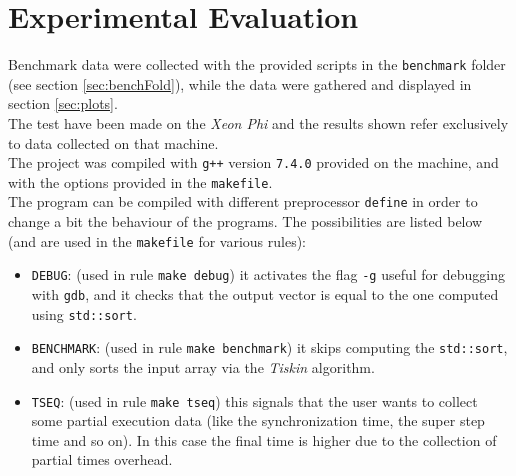 \documentclass[]{article}
\def\code#1{\texttt{#1}}
\begin{document}
\section{Experimental Evaluation}
\label{sec:eval}
Benchmark data were collected with the provided scripts in the \code{benchmark} folder (see section \ref{sec:benchFold}), while the data were gathered and displayed in section \ref{sec:plots}. \\
The test have been made on the \emph{Xeon Phi} and the results shown refer exclusively to data collected on that machine. \\
The project was compiled with \code{g++} version \code{7.4.0} provided on the machine, and with the options provided in the \code{makefile}. \\
The program can be compiled with different preprocessor \code{define} in order to change a bit the behaviour of the programs. The possibilities are listed below (and are used in the \code{makefile} for various rules):
\begin{itemize}
	\item \code{DEBUG}: (used in rule \code{make debug}) it activates the flag \code{-g} useful for debugging with \code{gdb}, and it checks that the output vector is equal to the one computed using \code{std::sort}.
	\item \code{BENCHMARK}: (used in rule \code{make benchmark}) it skips computing the \code{std::sort}, and only sorts the input array via the \emph{Tiskin} algorithm.
	\item \code{TSEQ}: (used in rule \code{make tseq}) this signals that the user wants to collect some partial execution data (like the synchronization time, the super step time and so on). In this case the final time is higher due to the collection of partial times overhead.
\end{itemize}
\end{document}
